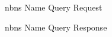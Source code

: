 \documentclass{article}
\begin{document}
\begin{figure}[H]
	\scriptsize
	\par
	\centering
	\varwidth{\linewidth}
	
	\endvarwidth
	\par

	\caption{\gls{nbns} Name Query Request}
	\label{fig:nbns-request}
\end{figure}

\begin{figure}[H]
	\scriptsize
	\par
	\centering
	\varwidth{\linewidth}
	
	\endvarwidth
	\par

	\caption{\gls{nbns} Name Query Response}
	\label{fig:nbns-response}
\end{figure}
\end{document}
